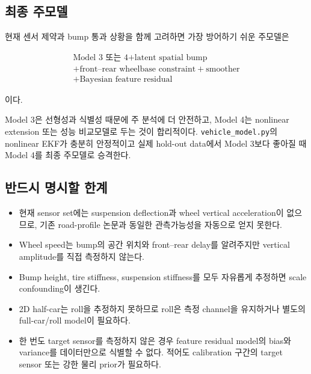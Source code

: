 \documentclass[letterpaper,10pt,journal,twocolumn]{ieeeconf}
\begin{document}
\subsection{최종 주모델}

현재 센서 제약과 bump 통과 상황을 함께 고려하면 가장 방어하기 쉬운 주모델은

\[
\boxed{
\begin{gathered}
\text{Model 3 또는 4}
+\text{latent spatial bump}\\
+\text{front--rear wheelbase constraint}
+\text{smoother}\\
+\text{Bayesian feature residual}
\end{gathered}
}
\]

이다.

Model 3은 선형성과 식별성 때문에 주 분석에 더 안전하고, Model 4는 nonlinear extension 또는 성능 비교모델로 두는 것이 합리적이다. \texttt{vehicle\_model.py}의 nonlinear EKF가 충분히 안정적이고 실제 hold-out data에서 Model 3보다 좋아질 때 Model 4를 최종 주모델로 승격한다.

\subsection{반드시 명시할 한계}

\begin{itemize}

\item
  현재 sensor set에는 suspension deflection과 wheel vertical acceleration이 없으므로, 기존 road-profile 논문과 동일한 관측가능성을 자동으로 얻지 못한다.
\item
  Wheel speed는 bump의 공간 위치와 front--rear delay를 알려주지만 vertical amplitude를 직접 측정하지 않는다.
\item
  Bump height, tire stiffness, suspension stiffness를 모두 자유롭게 추정하면 scale confounding이 생긴다.
\item
  2D half-car는 roll을 추정하지 못하므로 roll은 측정 channel을 유지하거나 별도의 full-car/roll model이 필요하다.
\item
  한 번도 target sensor를 측정하지 않은 경우 feature residual model의 bias와 variance를 데이터만으로 식별할 수 없다. 적어도 calibration 구간의 target sensor 또는 강한 물리 prior가 필요하다.
\end{itemize}
\end{document}
